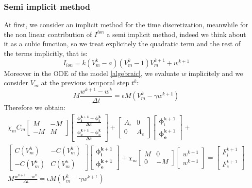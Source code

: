\documentclass[a4paper,12pt]{article}
\begin{document}
\subsubsection{Semi implicit method}
At first, we consider an implicit method for the time discretization, meanwhile for the non linear contribution of $I^{ion}$ a semi implicit method, indeed we think about it as a cubic function, so we treat explicitely the quadratic term and the rest of the terms implicitly, that is:
\begin{equation*}
I_{ion}=k(V_m^k-a)(V_m^k-1)V_m^{k+1}+w^{k+1}
\end{equation*}
Moreover in the ODE of the model \ref{algebraic}, we evaluate $w$ implicitely and we consider $V_m$ at the previous temporal step $t^k$:
\begin{equation*}
M \frac{w^{k+1}-w^k}{\Delta t}=\epsilon M (V_m^k-\gamma w^{k+1})
\end{equation*}
\vspace{5mm}
Therefore we obtain:
\begin{equation}
 \begin{gathered}
 \chi_mC_m \begin{bmatrix}M &-M \\ -M & M \end{bmatrix}
	\begin{bmatrix}\bm{\frac{\phi_i^{k+1}-\phi_i^{k}}{\Delta t}} \\ \bm{\frac{\phi_e^{k+1}-\phi_e^{k}}{\Delta t}}  \end{bmatrix}
	 + \begin{bmatrix}A_i & 0 \\ 0 & A_e \end{bmatrix}
	 \begin{bmatrix}\bm{\phi_i^{k+1}} \\ \bm{\phi_e^{k+1}} \end{bmatrix} +\\
	   \begin{bmatrix}C(V_m^h) & -C(V_m^h) \\ -C(V_m^h) & C(V_m^h) \end{bmatrix} 
	   \begin{bmatrix} \bm{\phi_i^{k+1}} \\ \bm{\phi_e^{k+1}}  \end{bmatrix} 
	   +\chi_m \begin{bmatrix}M & 0 \\ 0 & -M \end{bmatrix} 
	   	\begin{bmatrix}w^{k+1} \\ w^{k+1} \end{bmatrix} = 
	   	\begin{bmatrix} F_i^{k+1} \\ F_e^{k+1}\end{bmatrix}\\
	   M \frac{w^{k+1}-w^k}{\Delta t}=\epsilon M (V_m^k-\gamma w^{k+1})
\end{gathered}
\end{equation}
\end{document}
